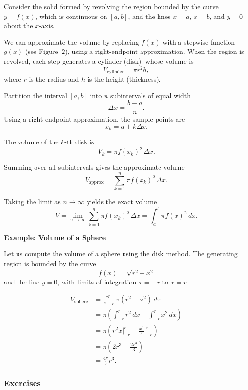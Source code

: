 Consider the solid formed by revolving the region bounded by the curve 
$y=f(x)$, which is continuous on $[a,b]$, and the lines $x=a$, $x=b$, and $y=0$ 
about the $x$-axis.

\medskip

We can approximate the volume by replacing $f(x)$ with a stepwise function 
$g(x)$ (see Figure~2), using a right-endpoint approximation. When the region 
is revolved, each step generates a cylinder (disk), whose volume is
\[
V_{\text{cylinder}} = \pi r^2 h,
\]
where $r$ is the radius and $h$ is the height (thickness).

\medskip

Partition the interval $[a,b]$ into $n$ subintervals of equal width
\[
\Delta x = \frac{b-a}{n}.
\]
Using a right-endpoint approximation, the sample points are
\[
x_k = a + k\Delta x.
\]

The volume of the $k$-th disk is
\[
V_k = \pi f(x_k)^2\,\Delta x.
\]

Summing over all subintervals gives the approximate volume
\[
V_{\text{approx}} = \sum_{k=1}^{n} \pi f(x_k)^2\,\Delta x.
\]

Taking the limit as $n \to \infty$ yields the exact volume
\[
V = \lim_{n\to\infty} \sum_{k=1}^{n} \pi f(x_k)^2\,\Delta x
= \int_a^b \pi f(x)^2\,dx.
\]

\medskip

\textbf{Example: Volume of a Sphere}

Let us compute the volume of a sphere using the disk method. The generating 
region is bounded by the curve
\[
f(x) = \sqrt{r^2 - x^2}
\]
and the line $y=0$, with limits of integration $x = -r$ to $x = r$.

\begin{align}
V_{\text{sphere}} 
&= \int_{-r}^{r} \pi (r^2 - x^2)\,dx \\
&= \pi\left(\int_{-r}^{r} r^2\,dx - \int_{-r}^{r} x^2\,dx\right) \\
&= \pi\left(r^2 x \Big|_{-r}^{r} - \frac{x^3}{3} \Big|_{-r}^{r}\right) \\
&= \pi\left(2r^3 - \frac{2r^3}{3}\right) \\
&= \frac{4\pi}{3} r^3.
\end{align}

\subsubsection{Exercises}
\label{sss:exer-disk}

